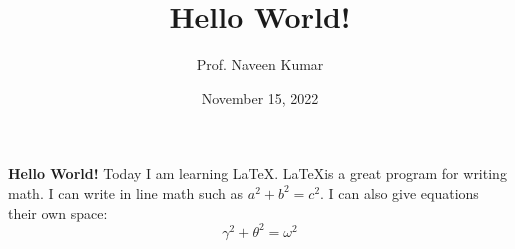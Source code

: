 \documentclass[11pt,a4paper]{article}
\title{Hello World!}
\author{Prof. Naveen Kumar}
\date{November 15, 2022}
\begin{document}
\maketitle
\textbf{Hello World!} Today I am learning \LaTeX. \LaTeX\hspace{3pt}is a great program for writing math. I can write in line math such as $a^2 + b^2 = c^2$. I can also give equations their own space:$$\gamma^2 + \theta^2 = \omega ^2$$
\end{document}
